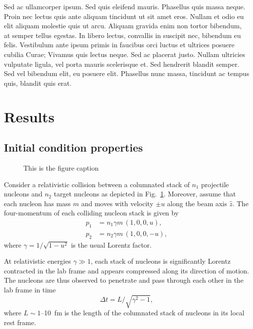 \documentclass[aps,prc,reprint,amsmath,nofootinbib]{revtex4-1}
\begin{document}
Sed ac ullamcorper ipsum. Sed quis eleifend mauris. Phasellus quis massa neque. Proin nec lectus quis ante aliquam tincidunt ut sit amet eros. Nullam et odio eu elit aliquam molestie quis ut arcu. Aliquam gravida enim non tortor bibendum, at semper tellus egestas. In libero lectus, convallis in suscipit nec, bibendum eu felis. Vestibulum ante ipsum primis in faucibus orci luctus et ultrices posuere cubilia Curae; Vivamus quis lectus neque. Sed ac placerat justo. Nullam ultricies vulputate ligula, vel porta mauris scelerisque et. Sed hendrerit blandit semper. Sed vel bibendum elit, eu posuere elit. Phasellus nunc massa, tincidunt ac tempus quis, blandit quis erat. 


\section{Results}

\subsection{Initial condition properties}

\begin{figure}
  \caption{\label{fig:collision} This is the figure caption}
\end{figure}
Consider a relativistic collision between a columnated stack of $n_1$ projectile nucleons and $n_2$ target nucleons as depicted in Fig.~\ref{fig:collision}.
Moreover, assume that each nucleon has mass $m$ and moves with velocity $\pm u$ along the beam axis $\hat{z}$.
The four-momentum of each colliding nucleon stack is given by
\begin{align}
  p_1 &= n_1 \gamma m\, (1, 0, 0, u),\\
  p_2 &= n_2 \gamma m\, (1, 0, 0, -u),
\end{align}
where $\gamma = 1/\sqrt{1 - u^2}$ is the usual Lorentz factor.

At relativistic energies $\gamma \gg 1$, each stack of nucleons is significantly Lorentz contracted in the lab frame and appears compressed along its direction of motion.
The nucleons are thus observed to penetrate and pass through each other in the lab frame in time
\begin{equation}
  \Delta t = L / \sqrt{\gamma^2 - 1}, 
\end{equation}
where $L\sim1$--10~fm is the length of the columnated stack of nucleons in its local rest frame. 
\end{document}
